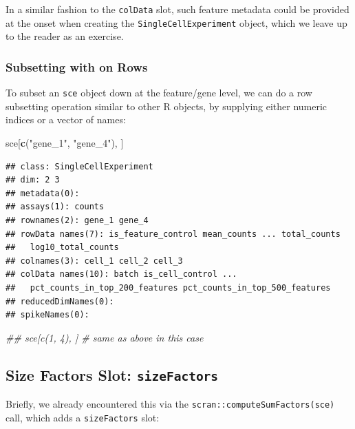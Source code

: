 \documentclass[]{book}
\newenvironment{Shaded}{\begin{snugshade}}{\end{snugshade}}
\newcommand{\CommentTok}[1]{\textcolor[rgb]{0.56,0.35,0.01}{\textit{#1}}}
\newcommand{\KeywordTok}[1]{\textcolor[rgb]{0.13,0.29,0.53}{\textbf{#1}}}
\newcommand{\NormalTok}[1]{#1}
\newcommand{\StringTok}[1]{\textcolor[rgb]{0.31,0.60,0.02}{#1}}
\begin{document}
In a similar fashion to the \texttt{colData} slot, such feature metadata could be provided at the onset when creating the \texttt{SingleCellExperiment} object, which we leave up to the reader as an exercise.

\hypertarget{subsetting-with-on-rows}{%
\subsubsection{Subsetting with on Rows}\label{subsetting-with-on-rows}}

To subset an \texttt{sce} object down at the feature/gene level, we can do a row subsetting operation similar to other R objects, by supplying either numeric indices or a vector of names:

\begin{Shaded}
\begin{Highlighting}[]
\NormalTok{sce[}\KeywordTok{c}\NormalTok{(}\StringTok{"gene_1"}\NormalTok{, }\StringTok{"gene_4"}\NormalTok{), ]}
\end{Highlighting}
\end{Shaded}

\begin{verbatim}
## class: SingleCellExperiment 
## dim: 2 3 
## metadata(0):
## assays(1): counts
## rownames(2): gene_1 gene_4
## rowData names(7): is_feature_control mean_counts ... total_counts
##   log10_total_counts
## colnames(3): cell_1 cell_2 cell_3
## colData names(10): batch is_cell_control ...
##   pct_counts_in_top_200_features pct_counts_in_top_500_features
## reducedDimNames(0):
## spikeNames(0):
\end{verbatim}

\begin{Shaded}
\begin{Highlighting}[]
\CommentTok{## sce[c(1, 4), ] # same as above in this case}
\end{Highlighting}
\end{Shaded}

\hypertarget{size-factors-slot-sizefactors}{%
\subsection{\texorpdfstring{Size Factors Slot: \texttt{sizeFactors}}{Size Factors Slot: sizeFactors}}\label{size-factors-slot-sizefactors}}

Briefly, we already encountered this via the \texttt{scran::computeSumFactors(sce)} call, which adds a \texttt{sizeFactors} slot:
\end{document}
